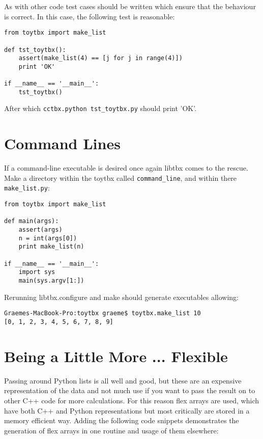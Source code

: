 \documentclass[a4paper, 11pt]{article}
\begin{document}
As with other code test cases should be written which ensure that the behaviour is correct. In this case, the following test is reasonable:

{\small
\begin{verbatim}
from toytbx import make_list

def tst_toytbx():
    assert(make_list(4) == [j for j in range(4)])
    print 'OK'

if __name__ == '__main__':
    tst_toytbx()
\end{verbatim}
}

After which \verb|cctbx.python tst_toytbx.py| should print 'OK'.

\section{Command Lines}

If a command-line executable is desired once again libtbx comes to the rescue. Make a directory within the toytbx called \verb|command_line|, and within there \verb|make_list.py|:

{\small
\begin{verbatim}
from toytbx import make_list

def main(args):
    assert(args)
    n = int(args[0])
    print make_list(n)

if __name__ == '__main__':
    import sys
    main(sys.argv[1:])
\end{verbatim}
}

Rerunning libtbx.configure and make should generate executables allowing:

{\small
\begin{verbatim}
Graemes-MacBook-Pro:toytbx graeme$ toytbx.make_list 10
[0, 1, 2, 3, 4, 5, 6, 7, 8, 9]
\end{verbatim}
}

\section{Being a Little More ... Flexible}

Passing around Python lists is all well and good, but these are an
expensive representation of the data and not much use if you want to
pass the result on to other C++ code for more calculations. For this
reason flex arrays are used, which have both C++ and Python
representations but most critically are stored in a memory efficient
way. Adding the following code snippets demonstrates the generation of
flex arrays in one routine and usage of them elsewhere:
\end{document}
